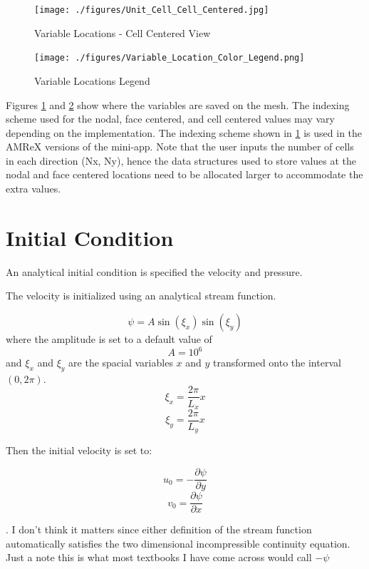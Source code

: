 \documentclass{article}
\begin{document}
\begin{figure}[h!]
	\texttt{[image: ./figures/Unit\_Cell\_Cell\_Centered.jpg]}
	\caption{Variable Locations - Cell Centered View}
	\label{fig: Cell Centered Unit Cell}
\end{figure}

\begin{figure}[h!]
	\texttt{[image: ./figures/Variable\_Location\_Color\_Legend.png]}
	\caption{Variable Locations Legend}
	\label{fig: Variable Location Legend}
\end{figure}


Figures \ref{fig: Cell Centered Unit Cell} and \ref{fig: Variable Location Legend} show where the variables are saved on the mesh. The indexing scheme used for the nodal, face centered, and cell centered values may vary depending on the implementation. The indexing scheme shown in \ref{fig: Cell Centered Unit Cell} is used in the AMReX versions of the mini-app. Note that the user inputs the number of cells in each direction (Nx, Ny), hence the data structures used to store values at the nodal and face centered locations need to be allocated larger to accommodate the extra values.  

\section{Initial Condition}
An analytical initial condition is specified the velocity and pressure.

The velocity is initialized using an analytical stream function. 

$$ \psi = A \sin(\xi_x) \sin(\xi_y) $$
where the amplitude is set to a default value of 
$$ A = 10^6 $$
and $\xi_x$ and $\xi_y$ are the spacial variables $x$ and $y$ transformed onto the interval $(0, 2\pi)$.
$$\xi_x = \frac{2\pi}{L_x}x$$
$$\xi_y = \frac{2\pi}{L_y}x$$

Then the initial velocity is set to:

$$ u_0 = -\frac{\partial \psi}{\partial y} $$
$$ v_0 = \frac{\partial \psi}{\partial x} $$

{. I don't think it matters since either definition of the stream function automatically satisfies the two dimensional incompressible continuity equation. Just a note this is what most textbooks I have come across would call $-\psi$}
\end{document}
